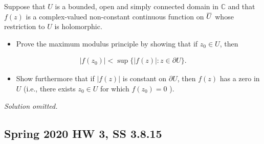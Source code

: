 \begin{problem}[?]

Suppose that \(U\) is a bounded, open and simply connected domain in
\(\mathbb{C}\) and that \(f(z)\) is a complex-valued non-constant
continuous function on
\(\mkern 1.5mu\overline{\mkern-1.5muU\mkern-1.5mu}\mkern 1.5mu\) whose
restriction to \(U\) is holomorphic.

\begin{itemize}
\tightlist
\item
  Prove the maximum modulus principle by showing that if
  \(z_{0} \in U\), then
\end{itemize}

\begin{align*}
\left|f\left(z_{0}\right)\right|<\sup \{|f(z)|: z \in \partial U\} .
\end{align*}

\begin{itemize}
\tightlist
\item
  Show furthermore that if \(|f(z)|\) is constant on \(\partial U\),
  then \(f(z)\) has a zero in \(U\) (i.e., there exists \(z_{0} \in U\)
  for which \(f\left(z_{0}\right)=0\) ).
\end{itemize}

\end{problem}

\emph{Solution omitted.}

\hypertarget{spring-2020-hw-3-ss-3.8.15}{%
\subsection{Spring 2020 HW 3, SS
3.8.15}\label{spring-2020-hw-3-ss-3.8.15}}


